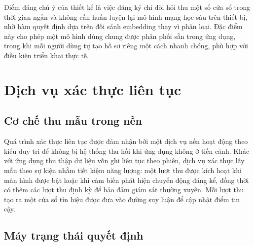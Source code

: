 \documentclass[../DoAn.tex]{subfiles}
\begin{document}
Điểm đáng chú ý của thiết kế là việc đăng ký chỉ đòi hỏi thu một số cửa sổ trong thời gian ngắn và không cần huấn luyện lại mô hình mạng học sâu trên thiết bị, nhờ hàm quyết định dựa trên đối sánh embedding thay vì phân loại. Đặc điểm này cho phép một mô hình dùng chung được phân phối sẵn trong ứng dụng, trong khi mỗi người dùng tự tạo hồ sơ riêng một cách nhanh chóng, phù hợp với điều kiện triển khai thực tế.

\section{Dịch vụ xác thực liên tục}
\label{sec:service}

\subsection{Cơ chế thu mẫu trong nền}

Quá trình xác thực liên tục được đảm nhận bởi một dịch vụ nền hoạt động theo kiểu duy trì để không bị hệ thống thu hồi khi ứng dụng không ở tiền cảnh. Khác với ứng dụng thu thập dữ liệu vốn ghi liên tục theo phiên, dịch vụ xác thực lấy mẫu theo sự kiện nhằm tiết kiệm năng lượng: một lượt thu được kích hoạt khi màn hình được bật hoặc khi cảm biến phát hiện chuyển động đáng kể, đồng thời có thêm các lượt thu định kỳ để bảo đảm giám sát thường xuyên. Mỗi lượt thu tạo ra một cửa sổ tín hiệu được đưa vào đường suy luận để cập nhật điểm tin cậy.

\subsection{Máy trạng thái quyết định}
\end{document}
